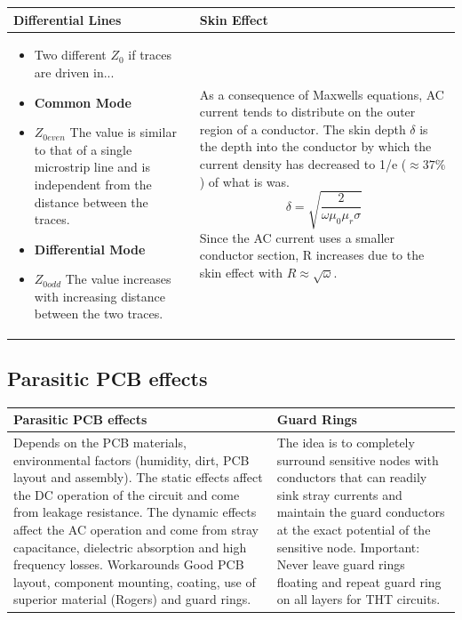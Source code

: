 \begin{table}[h!]
\begin{tabular}{|m{}|m{}|}
			\\
			\hline
				\textbf{Differential Lines} & \textbf{Skin Effect}
			\\
			\hline
				\begin{itemize}
					\setlength{\itemsep}{-4pt}
					\item[] Two different $Z_0$ if traces are driven in... 
					\item \textbf{Common Mode}
					\item[] $Z_{0even}$ The value is similar to that of a single microstrip line and is independent from the distance between the traces. 
					\item \textbf{Differential Mode}
					\item[] $Z_{0odd}$ The value increases with increasing distance between the two traces. 
				\end{itemize}
			&
				As a consequence of Maxwells equations, AC current tends to distribute on the outer region of a conductor. The skin depth $\delta$ is the depth into the conductor by which the current density has decreased to 1/e ($\approx 37 \%$) of what is was. 
				\begin{equation}
					\delta = \sqrt{\frac{2}{\omega \mu_0 \mu_r \sigma}}
				\end{equation}			
 				Since the AC current uses a smaller conductor section, R increases due to the skin effect with $R \approx \sqrt{\omega}$.
			\\
			\hline
			\end{tabular}
		\end{table}

	\subsection{Parasitic PCB effects}
		\begin{table}[h!]
			\centering
			\begin{tabular}{|m{}|m{}|}
			\hline
				\textbf{Parasitic PCB effects} & \textbf{Guard Rings} 
			\\
			\hline
				Depends on the PCB materials, environmental factors (humidity, dirt, PCB layout and assembly). The static effects affect the DC operation of the circuit and come from leakage resistance. The dynamic effects affect the AC operation and come from stray capacitance, dielectric absorption and high frequency losses.\newline
				Workarounds\newline
				Good PCB layout, component mounting, coating, use of superior material (Rogers) and guard rings. 
			&
				The idea is to completely surround sensitive nodes with conductors that can readily sink stray currents and maintain the guard conductors at the exact potential of the sensitive node. Important: Never leave guard rings floating and repeat guard ring on all layers for THT circuits. 
			\\
			\hline
			\end{tabular}
		\end{table}
		

